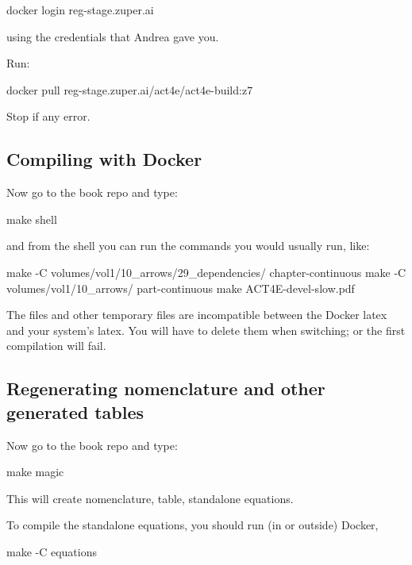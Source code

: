 \begin{console}
    docker login reg-stage.zuper.ai
\end{console}

using the credentials that Andrea gave you.

Run:

\begin{console}
    docker pull reg-stage.zuper.ai/act4e/act4e-build:z7
\end{console}

Stop if any error.

\subsection{Compiling with Docker}

Now go to the book repo and type:

\begin{console}
    make shell
\end{console}

and from the shell you can run the commands you would usually run, like:

\begin{console}
    make -C volumes/vol1/10_arrows/29_dependencies/ chapter-continuous
    make -C volumes/vol1/10_arrows/ part-continuous
    make ACT4E-devel-slow.pdf
\end{console}

\begin{remark}
    The  files and other temporary files are incompatible between the Docker latex and your system's latex. You will have to delete them when switching; or the first compilation will fail.
\end{remark}

\subsection{Regenerating nomenclature and other generated tables}



Now go to the book repo and type:

\begin{console}
    make magic
\end{console}

This will create nomenclature, table, standalone equations.

To compile the standalone equations, you should run (in or outside) Docker,

\begin{console}
    make -C equations
\end{console}

